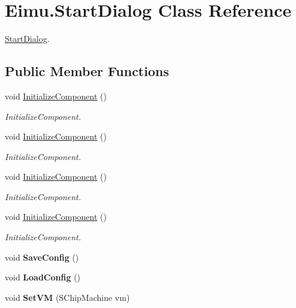 \hypertarget{class_eimu_1_1_start_dialog}{
\section{Eimu.StartDialog Class Reference}
\label{class_eimu_1_1_start_dialog}
}


\hyperlink{class_eimu_1_1_start_dialog}{StartDialog}.  


\subsection*{Public Member Functions}
\begin{DoxyCompactItemize}
\item 
void \hyperlink{class_eimu_1_1_start_dialog_a3386adbe1926dd79446d445ab100ccec}{InitializeComponent} ()
\begin{DoxyCompactList}\small\item\em InitializeComponent. \item\end{DoxyCompactList}\item 
void \hyperlink{class_eimu_1_1_start_dialog_a3386adbe1926dd79446d445ab100ccec}{InitializeComponent} ()
\begin{DoxyCompactList}\small\item\em InitializeComponent. \item\end{DoxyCompactList}\item 
void \hyperlink{class_eimu_1_1_start_dialog_a3386adbe1926dd79446d445ab100ccec}{InitializeComponent} ()
\begin{DoxyCompactList}\small\item\em InitializeComponent. \item\end{DoxyCompactList}\item 
void \hyperlink{class_eimu_1_1_start_dialog_a3386adbe1926dd79446d445ab100ccec}{InitializeComponent} ()
\begin{DoxyCompactList}\small\item\em InitializeComponent. \item\end{DoxyCompactList}\item 
\hypertarget{class_eimu_1_1_start_dialog_a1e8dc5fbba7a9b34eb9f99b6abe28d12}{
void {\bfseries SaveConfig} ()}
\label{class_eimu_1_1_start_dialog_a1e8dc5fbba7a9b34eb9f99b6abe28d12}

\item 
\hypertarget{class_eimu_1_1_start_dialog_ae91a441936c6c83134b6b7b9cbebe0ff}{
void {\bfseries LoadConfig} ()}
\label{class_eimu_1_1_start_dialog_ae91a441936c6c83134b6b7b9cbebe0ff}

\item 
\hypertarget{class_eimu_1_1_start_dialog_aea593fb452c45f85d65e76c12ed0d2ef}{
void {\bfseries SetVM} (SChipMachine vm)}
\label{class_eimu_1_1_start_dialog_aea593fb452c45f85d65e76c12ed0d2ef}

\end{DoxyCompactItemize}


